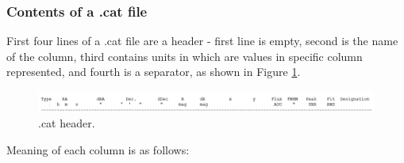 \subsubsection{Contents of a .cat file}\label{subsubsec:content_cat}
	
	First four lines of a .cat file are a header - first line is empty, second is the name of the column, third contains units in which are values in specific column represented, and fourth is a separator, as shown in Figure \ref{fig:cat_header}.
	
	\begin{figure}[H]
	  \includegraphics[width=\linewidth]{images/cat_columns}
		  \caption{.cat header.}
	  \label{fig:cat_header}
	\end{figure}
	
	Meaning of each column is as follows:
	
